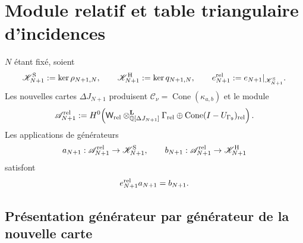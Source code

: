 \section{Module relatif et table triangulaire d'incidences}

$N$ étant fixé, soient
\begin{equation}\label{eq:pdf2-hodge-kernels}
 \mathscr K^{\rm S}_{N+1}:=\ker\rho_{N+1,N},
 \qquad
 \mathscr K^{\rm H}_{N+1}:=\ker q_{N+1,N},
 \qquad
 e_{N+1}^{\rm rel}:=e_{N+1}|_{\mathscr K^{\rm S}_{N+1}}.
\end{equation}
Les nouvelles cartes $\Delta J_{N+1}$ produisent
$\mathcal C_\nu=\operatorname{Cone}(\kappa_{a,b})$ et le module
\begin{equation}\label{eq:pdf2-hodge-a-rel}
 \mathscr A_{N+1}^{\rm rel}:=
 H^0\!\left(
  \mathsf W_{\rm rel}\otimes^{\mathbf L}_{\mathbb Q[\Delta J_{N+1}]}
  \Gamma_{\rm rel}
  \oplus\operatorname{Cone}(I-U_{\Gamma_9})_{\rm rel}
 \right).
\end{equation}
Les applications de générateurs
\begin{equation}\label{eq:pdf2-hodge-mapas-relativos}
 a_{N+1}:\mathscr A_{N+1}^{\rm rel}\to\mathscr K^{\rm S}_{N+1},
 \qquad
 b_{N+1}:\mathscr A_{N+1}^{\rm rel}\to\mathscr K^{\rm H}_{N+1}
\end{equation}
satisfont
\begin{equation}\label{eq:pdf2-hodge-factorizacion-relativa}
 e_{N+1}^{\rm rel}a_{N+1}=b_{N+1}.
\end{equation}

\subsection{Présentation générateur par générateur de la nouvelle carte}

